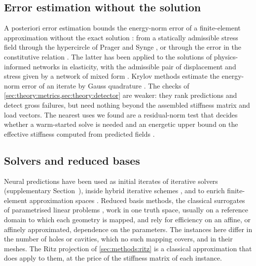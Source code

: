 \subsection{Error estimation without the solution}
A posteriori error estimation bounds the energy-norm error of a finite-element approximation
without the exact solution \cite{AinsworthOden2000}: from a statically admissible stress
field through the hypercircle of Prager and Synge \cite{PragerSynge1947}, or through the error in the constitutive relation \cite{LadevezeLeguillon1983}. The latter has
been applied to the solutions of physics-informed networks in elasticity, with the admissible pair of
displacement and stress given by a network of mixed form \cite{GuoHaghighat2022}. Krylov
methods estimate the energy-norm error of an iterate by Gauss quadrature
\cite{GolubMeurant1997,StrakosTichy2002}. The checks of
\cref{sec:theory:metrics,sec:theory:detector} are weaker: they rank predictions and detect gross failures, but need nothing beyond the
assembled stiffness matrix and load vectors. The nearest uses we found are a residual-norm test that decides
whether a warm-started solve is needed \cite{Wang2026PretrainFEM} and an energetic upper
bound on the effective stiffness computed from predicted fields
\cite{MonteiroFernandes2025}.

\subsection{Solvers and reduced bases}
Neural predictions have been used as initial iterates of iterative solvers
\cite{Wang2026PretrainFEM,Eshaghi2026NOWS,Sun2026FEVessel} (supplementary
Section~\SuppWarm{}), inside hybrid iterative schemes \cite{Lee2025MetaSolver}, and to enrich
finite-element approximation spaces \cite{Barucq2026Enrich}. Reduced basis methods, the
classical surrogates of parametrised linear problems \cite{Hesthaven2016RB}, work in one
truth space, usually on a reference domain to which each geometry is mapped, and rely for
efficiency on an affine, or affinely approximated, dependence on the parameters. The instances here differ in the number of holes or cavities, which no such mapping covers, and
in their meshes. The Ritz projection of \cref{sec:methods:ritz} is a classical approximation
that does apply to them, at the price of the stiffness matrix of each instance.
